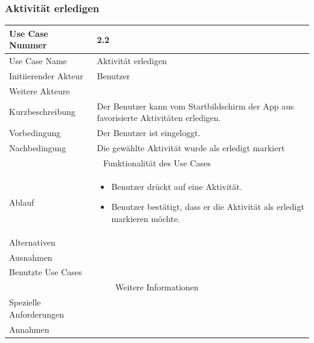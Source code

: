 \documentclass[10pt,a4paper]{article}
\begin{document}
\subsubsection{Aktivit\"at erledigen}
	\begin{tabularx}{\textwidth}{|l|X|}
	\hline Use Case Nummer & 2.2 \\ 
	\hline Use Case Name & Aktivit\"at erledigen \\ 
	\hline Initiierender Akteur & Benutzer \\
	\hline Weitere Akteure &  \\
	\hline Kurzbeschreibung & Der Benutzer kann vom Startbildschirm der App aus favorisierte Aktivit\"aten erledigen. \\
	\hline Vorbedingung & Der Benutzer ist eingeloggt. \\
	\hline Nachbedingung & Die gewählte Aktivit\"at wurde als erledigt markiert \\
	\hline \multicolumn{2}{|c|}{Funktionalität des Use Cases}\\
	\hline Ablauf & \begin{itemize}
		\item Benutzer drückt auf eine Aktivit\"at.
		\item Benutzer best\"atigt, dass er die Aktivit\"at als erledigt markieren möchte.
	\end{itemize} \\
	\hline Alternativen &  \\
	\hline Ausnahmen &  \\
	\hline Benutzte Use Cases &  \\
	\hline \multicolumn{2}{|c|}{Weitere Informationen} \\
	\hline Spezielle Anforderungen &  \\
	\hline Annahmen &  \\
	\hline
	\end{tabularx}
\end{document}
